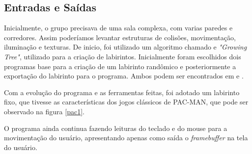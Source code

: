 
\subsection{Entradas e Saídas}\label{inputs}

Inicialmente, o grupo precisava de uma sala complexa, com varias paredes e corredores. Assim poderíamos levantar estruturas de colisões, movimentação, iluminação e texturas. De inicio, foi utilizado um algoritmo chamado e \textit{"Growing Tree"}\cite{algrithm}, utilizado para a criação de labirintos. Inicialmente foram escolhidos dois programas base para a criação de um labirinto randômico e posteriormente a exportação do labirinto para o programa. Ambos podem ser encontrados em \cite{ruby} e \cite{python}.

Com a evolução do programa e as ferramentas feitas, foi adotado um labirinto fixo, que tivesse as características dos jogos clássicos de PAC-MAN, que pode ser observado na figura \ref{pac1}.


O programa ainda continua fazendo leituras do teclado e do mouse para a movimentação do usuário, apresentando apenas como saída o \textit{framebuffer} na tela do usuário.





